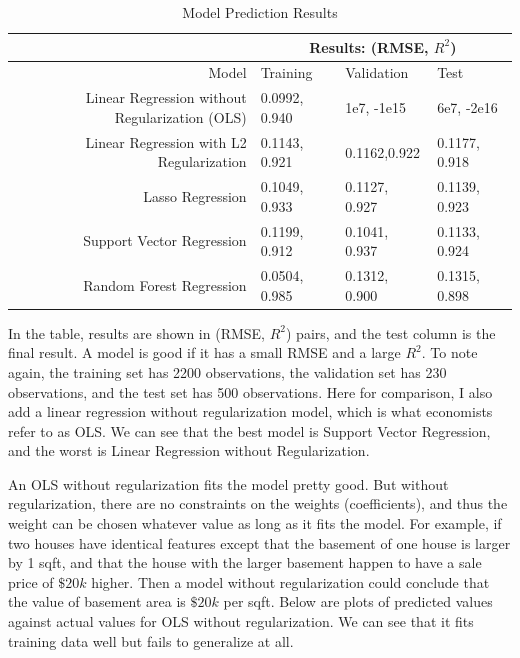 \documentclass[a4paper]{article}
\begin{document}
\begin{table}[H]
\centering
\caption{\large Model Prediction Results}
\vspace{0.3cm}
\begin{tabular}{| r | p{2cm} | p{2cm} | p{2cm} |}
\hline
 & \multicolumn{3}{|c|}{Results: (RMSE, $R^2$)} \\
\hline
Model & Training & Validation & Test \\
\hline
Linear Regression without Regularization (OLS) & 0.0992, 0.940 & 1e7, -1e15 & 6e7, -2e16 \\
\hline
Linear Regression with L2 Regularization & 0.1143, 0.921 & 0.1162,0.922 & 0.1177, 0.918 \\
\hline
Lasso Regression & 0.1049, 0.933 & 0.1127, 0.927 & 0.1139, 0.923 \\
\hline
Support Vector Regression & 0.1199, 0.912 & 0.1041, 0.937 & 0.1133, 0.924 \\
\hline
Random Forest Regression & 0.0504, 0.985 & 0.1312, 0.900 & 0.1315, 0.898 \\
\hline
\end{tabular}
\end{table}

In the table, results are shown in (RMSE, $R^2$) pairs, and the test column is the final result. A model is good if it has a small RMSE and a large $R^2$. To note again, the training set has 2200 observations, the validation set has 230 observations, and the test set has 500 observations. Here for comparison, I also add a linear regression without regularization model, which is what economists refer to as OLS. We can see that the best model is Support Vector Regression, and the worst is Linear Regression without Regularization.

An OLS without regularization fits the model pretty good. But without regularization, there are no constraints on the weights (coefficients), and thus the weight can be chosen whatever value as long as it fits the model. For example, if two houses have identical features except that the basement of one house is larger by 1 sqft, and that the house with the larger basement happen to have a sale price of $\$20k$ higher. Then a model without regularization could conclude that the value of basement area is $\$20k$ per sqft. Below are plots of predicted values against actual values for OLS without regularization. We can see that it fits training data well but fails to generalize at all.
\end{document}
